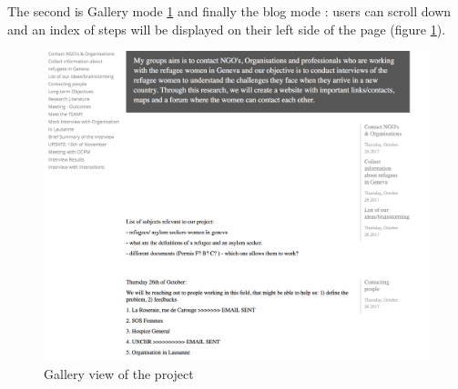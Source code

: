 The second is Gallery mode \ref{img-viewgallerymode3} and finally  the  blog mode : users can scroll down and an index of steps will be displayed on their left side of the page (figure \ref{img-viewgallerymode3}).

\begin{figure}[H]
	\centering
	\includegraphics[scale=.3]{./images/img-refugeeintegrationblogmode.png}
	\caption{Gallery view of the project} 
	\label{img-viewgallerymode3}
\end{figure}


